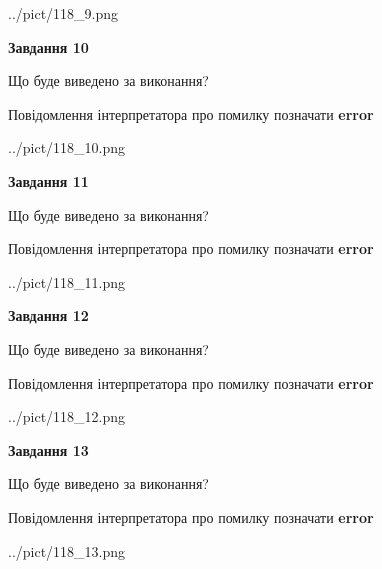 \documentclass[11pt, ukrainian]{article}
\begin{document}
{\begin {large}
\begin{center}
	{../pict/118_9.png}
\end{center}
\newpage

{\begin {center}\textbf{Завдання 10}\end {center}}\par
Що буде виведено за виконання? \par
Повідомлення інтерпретатора про помилку позначати \textbf{error}

\begin{center}
	{../pict/118_10.png}
\end{center}
\newpage

{\begin {center}\textbf{Завдання 11}\end {center}}\par
Що буде виведено за виконання? \par
Повідомлення інтерпретатора про помилку позначати \textbf{error}

\begin{center}
	{../pict/118_11.png}
\end{center}
\newpage

{\begin {center}\textbf{Завдання 12}\end {center}}\par
Що буде виведено за виконання? \par
Повідомлення інтерпретатора про помилку позначати \textbf{error}

\begin{center}
	{../pict/118_12.png}
\end{center}
\newpage

{\begin {center}\textbf{Завдання 13}\end {center}}\par
Що буде виведено за виконання? \par
Повідомлення інтерпретатора про помилку позначати \textbf{error}

\begin{center}
	{../pict/118_13.png}
\end{center}
\newpage


\end{large}}
\end{document}
